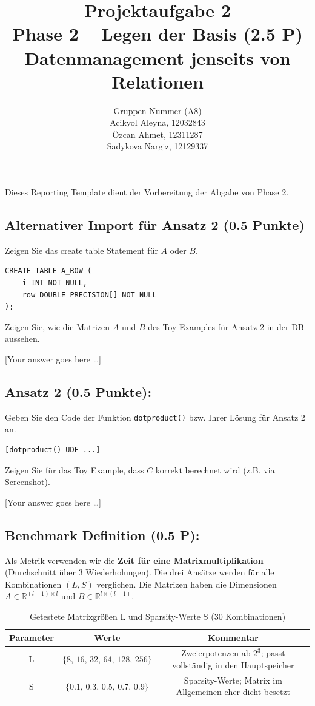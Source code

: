 \documentclass[11pt]{scrartcl}
\title{
  \textbf{\large Projektaufgabe 2 } \\
  Phase 2 – Legen der Basis (2.5 P) \\
  {\large Datenmanagement jenseits von Relationen}
}
\author{
 Gruppen Nummer (A8) \\
  \large Acikyol Aleyna, 12032843 \\
  \large Özcan Ahmet, 12311287 \\
  \large Sadykova Nargiz, 12129337 \\
}
\newcommand{\youranswerhere}{[Your answer goes here \ldots]}
\begin{document}
\maketitle\thispagestyle{empty}

Dieses Reporting Template dient der Vorbereitung der Abgabe von Phase 2.

\subsection*{Alternativer Import für Ansatz 2 (0.5 Punkte)}

Zeigen Sie das create table Statement für $A$ oder $B$. 

\begin{lstlisting}[style=dmrsql]
CREATE TABLE A_ROW (
    i INT NOT NULL,
    row DOUBLE PRECISION[] NOT NULL
);
\end{lstlisting}

Zeigen Sie, wie die Matrizen $A$ und $B$ des Toy Examples für Ansatz 2 in der DB aussehen.

\youranswerhere{}

\subsection*{Ansatz 2 (0.5 Punkte):}

Geben Sie den Code der Funktion \texttt{dotproduct()} bzw. Ihrer Lösung für Ansatz 2 an.

\begin{lstlisting}[style=dmrsql]
[dotproduct() UDF ...]
\end{lstlisting}

Zeigen Sie für das Toy Example, dass $C$ korrekt berechnet wird (z.B. via Screenshot).

\youranswerhere{}

\subsection*{Benchmark Definition (0.5 P):}

Als Metrik verwenden wir die \textbf{Zeit für eine Matrixmultiplikation} (Durchschnitt über 3 Wiederholungen).
Die drei Ansätze werden für alle Kombinationen $(L, S)$ verglichen.
Die Matrizen haben die Dimensionen $A \in \mathbb{R}^{(l-1) \times l}$ und $B \in \mathbb{R}^{l \times (l-1)}$.

\begin{table}[h]
	\centering
	\begin{tabular}{ c c c }
		\hline
		Parameter & Werte & Kommentar \\
		\hline
		L & $\{8,\, 16,\, 32,\, 64,\, 128,\, 256\}$ & Zweierpotenzen ab $2^3$; passt vollständig in den Hauptspeicher \\
		S & $\{0.1,\, 0.3,\, 0.5,\, 0.7,\, 0.9\}$ & Sparsity-Werte; Matrix im Allgemeinen eher dicht besetzt \\
		\hline
	\end{tabular}
	\caption{Getestete Matrixgrößen L und Sparsity-Werte S (30 Kombinationen)}
	\label{tab:MatrixgrößenLUndSparsityWerteS}
\end{table}
\end{document}
